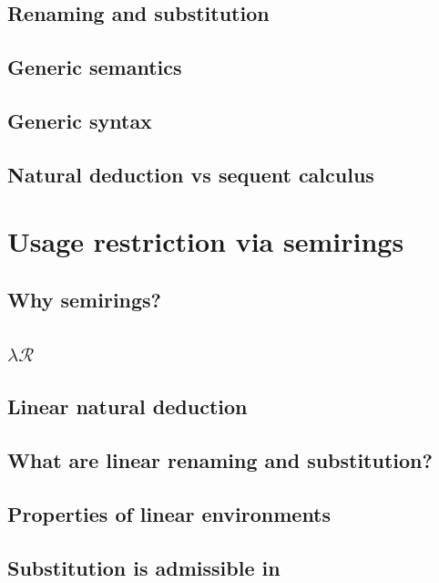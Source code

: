\documentclass[a4paper,oneside,11pt]{book}
\theoremstyle{definition}
\begin{document}
  \section{Renaming and substitution}\label{sec:kits}
  
  \section{Generic semantics}
  \section{Generic syntax}
  \section{Natural deduction vs sequent calculus}
  

\chapter{Usage restriction via semirings}
  \section{Why semirings?}
  

  \section{$\lambda\mathcal{R}$}

  \section{Linear natural deduction}
  

  \section{What are linear renaming and substitution?}
  

  \section{Properties of linear environments}
  

  \section{Substitution is admissible in \name{}}
  
\end{document}
